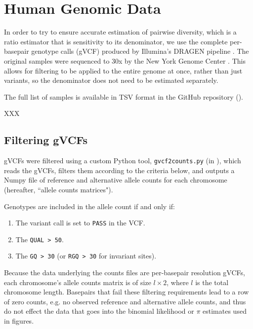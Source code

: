 \documentclass[11pt]{article}
\begin{document}
\section{Human Genomic Data}

In order to try to ensure accurate estimation of pairwise diversity, which is a
ratio estimator that is sensitivity to its denominator, we use the complete
per-basepair genotype calls (gVCF) produced by Illumina's DRAGEN pipeline
\parencite{Illumina_Inc2020-dk}. The original samples were sequenced to 30x by
the New York Genome Center \parencite{Byrska-Bishop2022-tn}. This allows for
filtering to be applied to the entire genome at once, rather than just
variants, so the denominator does not need to be estimated separately.

The full list of samples is available in TSV format in the GitHub repository
().

XXX

\subsection{Filtering gVCFs}
\label{supp:filter}

gVCFs were filtered using a custom Python tool, \texttt{gvcf2counts.py} (in
), which reads the gVCFs, filters them according to
the criteria below, and outputs a Numpy  file of reference and
alternative allele counts for each chromosome (hereafter, ``allele counts
matrices").

Genotypes are included in the allele count if and only if:

\begin{enumerate}
  \item The variant call is set to \texttt{PASS} in the VCF.
  \item The \texttt{QUAL > 50}.
  \item The \texttt{GQ > 30} (or \texttt{RGQ > 30} for invariant sites).
\end{enumerate}

Because the data underlying the counts files are per-basepair resolution gVCFs,
each chromosome's allele counts matrix is of size $l \times 2$, where $l$ is
the total chromosome length. Basepairs that fail these filtering requirements
lead to a row of zero counts, e.g. no observed reference and alternative allele
counts, and thus do not effect the data that goes into the binomial likelihood
or $\pi$ estimates used in figures.
\end{document}
